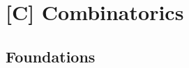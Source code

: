 \documentclass[../../main.tex]{subfiles}
\begin{document}
\chapter{[C] Combinatorics}


\section{Foundations}
\end{document}
